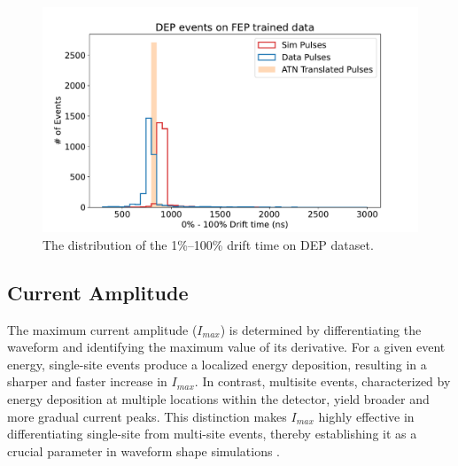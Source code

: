 \begin{figure}[!htb]
\centering
\includegraphics[width=0.95\linewidth,trim={0pc 0pc 0pc 0pc},clip]{ch8/figs/dep_drift_time.pdf}
\caption{The distribution of the 1\%–100\% drift time on DEP dataset.}
\label{fig:drift_times_dep}
\end{figure}

\subsection{Current Amplitude}

The maximum current amplitude ($I_{max}$) is determined by differentiating the waveform and identifying the maximum value of its derivative. For a given event energy, single-site events produce a localized energy deposition, resulting in a sharper and faster increase in $I_{max}$. In contrast, multisite events, characterized by energy deposition at multiple locations within the detector, yield broader and more gradual current peaks. This distinction makes $I_{max}$ highly effective in differentiating single-site from multi-site events, thereby establishing it as a crucial parameter in waveform shape simulations \cite{mjd_psd}. 

